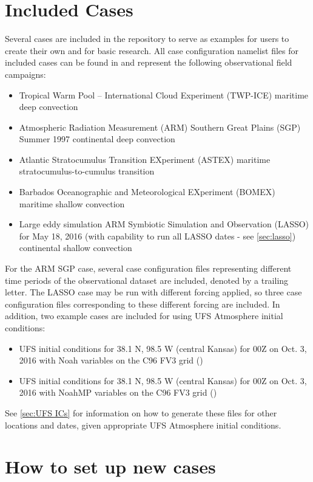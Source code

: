\section{Included Cases}
Several cases are included in the repository to serve as examples for users to create their own and for basic research. All case configuration namelist files for included cases can be found in  and represent the following observational field campaigns:
\begin{itemize}
\item Tropical Warm Pool -- International Cloud Experiment (TWP-ICE) maritime deep convection
\item Atmospheric Radiation Measurement (ARM) Southern Great Plains (SGP) Summer 1997 continental deep convection
\item Atlantic Stratocumulus Transition EXperiment (ASTEX) maritime stratocumulus-to-cumulus transition
\item Barbados Oceanographic and Meteorological EXperiment (BOMEX) maritime shallow convection
\item Large eddy simulation ARM Symbiotic Simulation and Observation (LASSO) for May 18, 2016 (with capability to run all LASSO dates - see \ref{sec:lasso}) continental shallow convection
\end{itemize}
For the ARM SGP case, several case configuration files representing different time periods of the observational dataset are included, denoted by a trailing letter. The LASSO case may be run with different forcing applied, so three case configuration files corresponding to these different forcing are included. In addition, two example cases are included for using UFS Atmosphere initial conditions:
\begin{itemize}
\item UFS initial conditions for 38.1 N, 98.5 W (central Kansas) for 00Z on Oct. 3, 2016 with Noah variables on the C96 FV3 grid ()
\item UFS initial conditions for 38.1 N, 98.5 W (central Kansas) for 00Z on Oct. 3, 2016 with NoahMP variables on the C96 FV3 grid ()
\end{itemize}
See \ref{sec:UFS ICs} for information on how to generate these files for other locations and dates, given appropriate UFS Atmosphere initial conditions.

\section{How to set up new cases}

